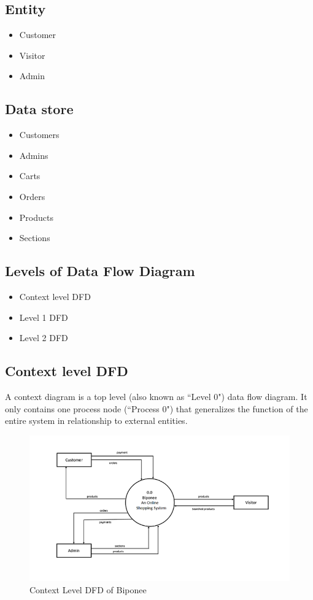 \subsection{Entity  }
  \begin{itemize}
  \item Customer
  \item Visitor
    \item Admin
  
    
    

\end{itemize}
\subsection{Data store}
  \begin{itemize}
  \item Customers
  \item Admins
    \item Carts
  \item Orders
  \item Products
    \item Sections
  
\end{itemize}

\subsection{Levels of Data Flow Diagram}
  \begin{itemize}
  \item Context level DFD
  \item Level 1 DFD
    \item Level 2 DFD
  
  
\end{itemize}



\subsection{Context level DFD}
A context diagram is a top level (also known as ``Level 0") data flow diagram. It only contains one process node (``Process 0") that generalizes the function of the entire system in relationship to external entities.\\

 \begin{figure}
 \centering
\includegraphics{figures/level0final.png}
\caption{Context Level DFD of Biponee}
\end{figure}

